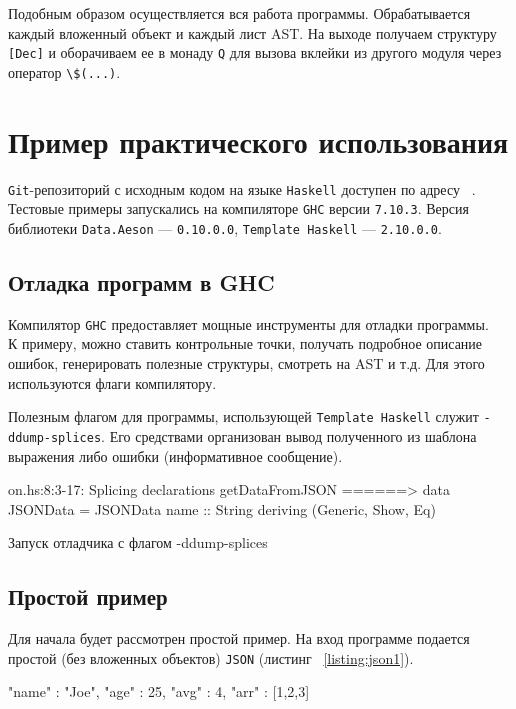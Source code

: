 Подобным образом осуществляется вся работа программы. Обрабатывается каждый вложенный объект и каждый лист AST. На выходе получаем структуру \lstinline{[Dec]} и оборачиваем ее в монаду \lstinline{Q} для вызова вклейки из другого модуля через оператор \lstinline{\$(...)}.

\chapter{Пример практического использования}

\lstinline{Git}-репозиторий с исходным кодом на языке \lstinline{Haskell} доступен по адресу ~\cite{diploma}. Тестовые примеры запускались на компиляторе \lstinline{GHC} версии \lstinline{7.10.3}. Версия библиотеки \lstinline{Data.Aeson} --- \lstinline{0.10.0.0}, \lstinline{Template Haskell} --- \lstinline{2.10.0.0}.

\section{Отладка программ в GHC}

Компилятор \lstinline{GHC} предоставляет мощные инструменты для отладки программы. ~\cite{debugGHC} К примеру, можно ставить контрольные точки, получать подробное описание ошибок, генерировать полезные структуры, смотреть на AST и т.д. Для этого используются флаги компилятору. 

Полезным флагом для программы, использующей \lstinline{Template Haskell} служит \lstinline{-ddump-splices}. Его средствами организован вывод полученного из шаблона выражения либо ошибки (информативное сообщение).

\begin{ListingEnv}[H]
\begin{Verb}
on.hs:8:3-17: Splicing declarations
    getDataFromJSON
  ======>
    data JSONData
      = JSONData {name :: String}
      deriving (Generic, Show, Eq)
\end{Verb}
\caption{Запуск отладчика с флагом -ddump-splices}
\end{ListingEnv}

\section{Простой пример}
Для начала будет рассмотрен простой пример. На вход программе подается простой (без вложенных объектов) \lstinline{JSON} (листинг ~\ref{listing:json1}).

\begin{ListingEnv}[H]
\begin{Verb}
{
    "name" : "Joe",
    "age" : 25,
    "avg" : 4,
    "arr" : [1,2,3]
}
\end{Verb}
\label{listing:json1}
\end{ListingEnv}

